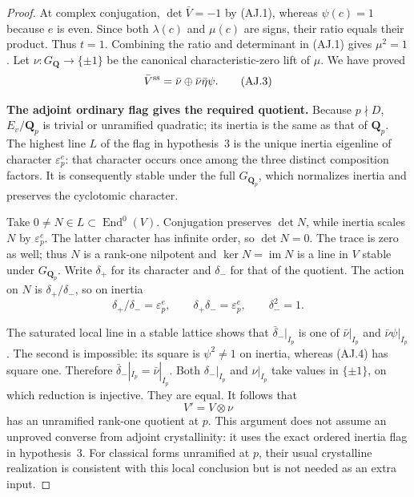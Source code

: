 \documentclass[11pt,a4paper]{article}
\theoremstyle{definition}
\renewcommand{\paragraph}[1]{\par\smallskip\noindent\textbf{#1}\quad\ignorespaces}
\begin{document}
\begin{proof}
At complex conjugation, $\det\bar V=-1$ by
(AJ.1), whereas $\psi(c)=1$ because $e$ is
even.  Since both $\lambda(c)$ and $\mu(c)$
are signs, their ratio equals their product.
Thus $t=1$.  Combining the ratio and determinant
in (AJ.1) gives $\mu^2=1$.
Let $\nu:G_{\mathbf Q}\to\{\pm1\}$ be the
canonical characteristic-zero lift of $\mu$.
We have proved
\[
          \bar V^{\rm ss}=
                  \bar\nu\oplus\bar\nu\bar\eta\psi.
                                                               \tag{AJ.3}
\]

\paragraph{The adjoint ordinary flag gives the required quotient.}
Because $p\nmid D$, $E_v/\mathbf Q_p$ is trivial
or unramified quadratic; its inertia is the same
as that of $\mathbf Q_p$.
The highest line $L$ of the flag in hypothesis~3
is the unique inertia eigenline of character
$\varepsilon_p^e$: that character occurs once
among the three distinct composition factors.
It is consequently stable under the full
$G_{\mathbf Q_p}$, which normalizes inertia and
preserves the cyclotomic character.

Take $0\ne N\in L\subset\operatorname{End}^0(V)$.
Conjugation preserves $\det N$, while inertia
scales $N$ by $\varepsilon_p^e$.  The latter
character has infinite order, so $\det N=0$.
The trace is zero as well; thus $N$ is a
rank-one nilpotent and
$\ker N=\operatorname{im}N$ is a line in $V$
stable under $G_{\mathbf Q_p}$.
Write $\delta_+$ for its character and
$\delta_-$ for that of the quotient.
The action on $N$ is $\delta_+/\delta_-$, so
on inertia
\[
 \delta_+/\delta_-=\varepsilon_p^e,
 \qquad \delta_+\delta_-=\varepsilon_p^e,
 \qquad \delta_-^2=1.                                    \tag{AJ.4}
\]

The saturated local line in a stable lattice
shows that $\bar\delta_-|_{I_p}$ is one of
$\bar\nu|_{I_p}$ and $\bar\nu\psi|_{I_p}$.
The second is impossible: its square is
$\psi^2\ne1$ on inertia, whereas (AJ.4) has
square one.  Therefore
$\bar\delta_-|_{I_p}=\bar\nu|_{I_p}$.
Both $\delta_-|_{I_p}$ and $\nu|_{I_p}$ take
values in $\{\pm1\}$, on which reduction is
injective.  They are equal.  It follows that
\[
                            V'=V\otimes\nu              \tag{AJ.5}
\]
has an unramified rank-one quotient at $p$.
This argument does not assume an unproved
converse from adjoint crystallinity: it uses
the exact ordered inertia flag in hypothesis~3.
For classical forms unramified at $p$, their
usual crystalline realization is consistent
with this local conclusion but is not needed
as an extra input.


\end{proof}
\end{document}

